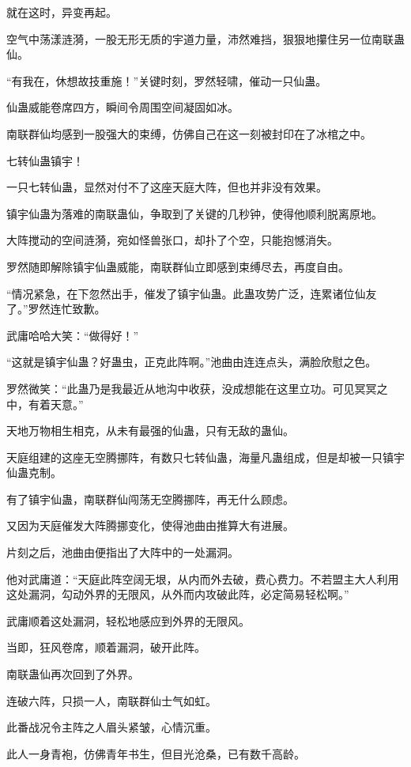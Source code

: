 \begin{this_body}
就在这时，异变再起。

空气中荡漾涟漪，一股无形无质的宇道力量，沛然难挡，狠狠地攥住另一位南联蛊仙。

“有我在，休想故技重施！”关键时刻，罗然轻啸，催动一只仙蛊。

仙蛊威能卷席四方，瞬间令周围空间凝固如冰。

南联群仙均感到一股强大的束缚，仿佛自己在这一刻被封印在了冰棺之中。

七转仙蛊镇宇！

一只七转仙蛊，显然对付不了这座天庭大阵，但也并非没有效果。

镇宇仙蛊为落难的南联蛊仙，争取到了关键的几秒钟，使得他顺利脱离原地。

大阵搅动的空间涟漪，宛如怪兽张口，却扑了个空，只能抱憾消失。

罗然随即解除镇宇仙蛊威能，南联群仙立即感到束缚尽去，再度自由。

“情况紧急，在下忽然出手，催发了镇宇仙蛊。此蛊攻势广泛，连累诸位仙友了。”罗然连忙致歉。

武庸哈哈大笑：“做得好！”

“这就是镇宇仙蛊？好蛊虫，正克此阵啊。”池曲由连连点头，满脸欣慰之色。

罗然微笑：“此蛊乃是我最近从地沟中收获，没成想能在这里立功。可见冥冥之中，有着天意。”

天地万物相生相克，从未有最强的仙蛊，只有无敌的蛊仙。

天庭组建的这座无空腾挪阵，有数只七转仙蛊，海量凡蛊组成，但是却被一只镇宇仙蛊克制。

有了镇宇仙蛊，南联群仙闯荡无空腾挪阵，再无什么顾虑。

又因为天庭催发大阵腾挪变化，使得池曲由推算大有进展。

片刻之后，池曲由便指出了大阵中的一处漏洞。

他对武庸道：“天庭此阵空阔无垠，从内而外去破，费心费力。不若盟主大人利用这处漏洞，勾动外界的无限风，从外而内攻破此阵，必定简易轻松啊。”

武庸顺着这处漏洞，轻松地感应到外界的无限风。

当即，狂风卷席，顺着漏洞，破开此阵。

南联蛊仙再次回到了外界。

连破六阵，只损一人，南联群仙士气如虹。

此番战况令主阵之人眉头紧皱，心情沉重。

此人一身青袍，仿佛青年书生，但目光沧桑，已有数千高龄。


\end{this_body}
